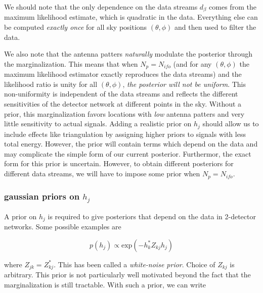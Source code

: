 \documentclass[10pt]{article}
\begin{document}
We should note that the only dependence on the data streams $d_\beta$ comes from the maximum likelihood estimate, which is quadratic in the data. Everything else can be computed \emph{exactly once} for all sky positions $(\theta, \phi)$ and then used to filter the data. 

We also note that the antenna patters \emph{naturally} modulate the posterior through the marginalization. This means that when $N_p=N_{ifo}$ (and for any $(\theta, \phi)$ the maximum likelihood estimator exactly reproduces the data streams) and the likelihood ratio is unity for all $(\theta,\phi)$, \emph{the posterior will not be uniform}. This non-uniformity is independent of the data streams and reflects the different sensitivities of the detector network at different points in the sky. Without a prior, this marginalization favors locations with \emph{low} antenna patters and very little sensitivity to actual signals. Adding a realistic prior on $h_j$ should allow us to include effects like triangulation by assigning higher priors to signals with less total energy. However, the prior will contain terms which depend on the data and may complicate the simple form of our current posterior. Furthermor, the exact form for this prior is uncertain. However, to obtain different posteriors for different data streams, we will have to impose some prior when $N_p=N_{ifo}$.

\subsubsection{gaussian priors on $h_j$}

A prior on $h_j$ is required to give posteriors that depend on the data in 2-detector networks. Some possible examples are

\begin{equation}
p(h_j) \propto \mathrm{exp}\left( -h_k^\ast Z_{kj} h_j \right)
\end{equation}

where $Z_{jk} = Z_{kj}^\ast$. This has been called a \emph{white-noise prior}. Choice of $Z_{kj}$ is arbitrary. This prior is not particularly well motivated beyond the fact that the marginalization is still tractable. With such a prior, we can write
\end{document}
